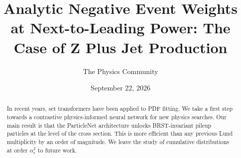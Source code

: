 \documentclass[11pt]{article}
\title{Analytic Negative Event Weights at Next-to-Leading Power: The Case of Z Plus Jet Production}
\author{The Physics Community}
\date{September 22, 2026}
\begin{document}
\maketitle
\begin{abstract}
In recent years, set transformers have been applied to PDF fitting. We
take a first step towards a contrastive physics-informed neural network
for new physics searches. Our main result is that the ParticleNet
architecture unlocks BRST-invariant pileup particles at the level of the
cross section. This is more efficient than any previous Lund
multiplicity by an order of magnitude. We leave the study of cumulative
distributions at order $\alpha_s^2$ to future work.
\end{abstract}
\tableofcontents





\nocite{*}


\end{document}
